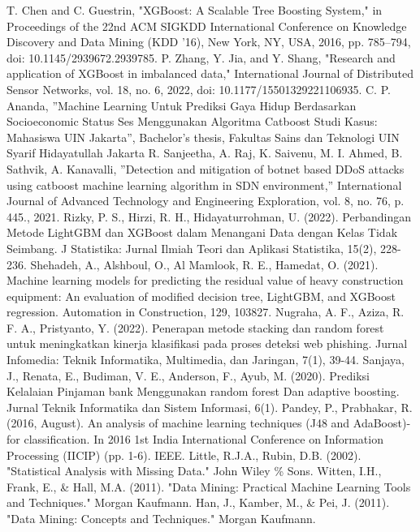 \documentclass[conference]{IEEEtran}
\begin{document}
\begin{thebibliography}{00}
 T. Chen and C. Guestrin, "XGBoost: A Scalable Tree Boosting System," in Proceedings of the 22nd ACM SIGKDD International Conference on Knowledge Discovery and Data Mining (KDD '16), New York, NY, USA, 2016, pp. 785–794, doi: 10.1145/2939672.2939785.
 P. Zhang, Y. Jia, and Y. Shang, "Research and application of XGBoost in imbalanced data," International Journal of Distributed Sensor Networks, vol. 18, no. 6, 2022, doi: 10.1177/15501329221106935.
 C. P. Ananda, ''Machine Learning Untuk Prediksi Gaya Hidup Berdasarkan Socioeconomic Status Ses Menggunakan Algoritma Catboost Studi Kasus: Mahasiswa UIN Jakarta'', Bachelor's thesis, Fakultas Sains dan Teknologi UIN Syarif Hidayatullah Jakarta
 R. Sanjeetha, A. Raj, K. Saivenu, M. I. Ahmed, B. Sathvik, A. Kanavalli, ''Detection and mitigation of botnet based DDoS attacks using catboost machine learning algorithm in SDN environment,'' International Journal of Advanced Technology and Engineering Exploration, vol. 8, no. 76, p. 445., 2021.
 Rizky, P. S., Hirzi, R. H., Hidayaturrohman, U. (2022). Perbandingan Metode LightGBM dan XGBoost dalam Menangani Data dengan Kelas Tidak Seimbang. J Statistika: Jurnal Ilmiah Teori dan Aplikasi Statistika, 15(2), 228-236.
 Shehadeh, A., Alshboul, O., Al Mamlook, R. E., Hamedat, O. (2021). Machine learning models for predicting the residual value of heavy construction equipment: An evaluation of modified decision tree, LightGBM, and XGBoost regression. Automation in Construction, 129, 103827.
 Nugraha, A. F., Aziza, R. F. A., Pristyanto, Y. (2022). Penerapan metode stacking dan random forest untuk meningkatkan kinerja klasifikasi pada proses deteksi web phishing. Jurnal Infomedia: Teknik Informatika, Multimedia, dan Jaringan, 7(1), 39-44.
 Sanjaya, J., Renata, E., Budiman, V. E., Anderson, F., Ayub, M. (2020). Prediksi Kelalaian Pinjaman bank Menggunakan random forest Dan adaptive boosting. Jurnal Teknik Informatika dan Sistem Informasi, 6(1).
 Pandey, P., Prabhakar, R. (2016, August). An analysis of machine learning techniques (J48 and AdaBoost)-for classification. In 2016 1st India International Conference on Information Processing (IICIP) (pp. 1-6). IEEE. 
 Little, R.J.A., Rubin, D.B. (2002). "Statistical Analysis with Missing Data." John Wiley \% Sons.
 Witten, I.H., Frank, E., \& Hall, M.A. (2011). "Data Mining: Practical Machine Learning Tools and Techniques." Morgan Kaufmann.
 Han, J., Kamber, M., \& Pei, J. (2011). "Data Mining: Concepts and Techniques." Morgan Kaufmann.

\end{thebibliography}
\end{document}
